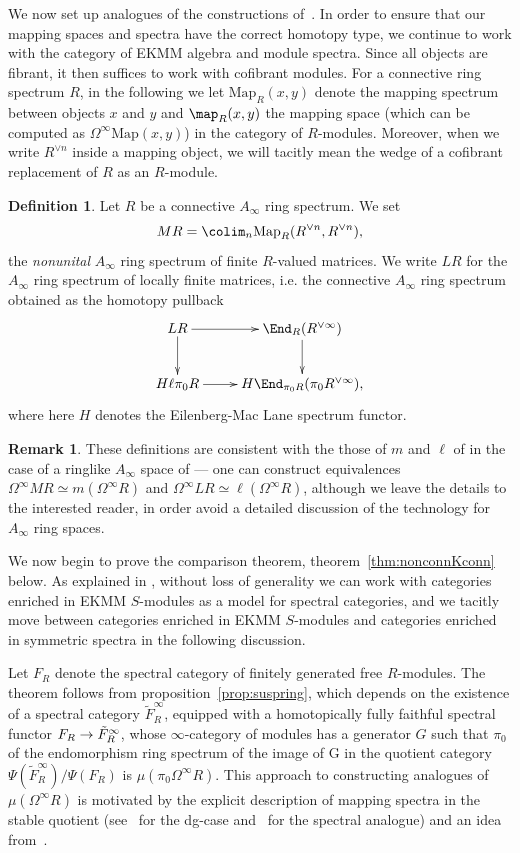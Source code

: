 \documentclass{amsart}
\renewcommand{\to}{\mathchoice{\longrightarrow}{\rightarrow}{\rightarrow}{\rightarrow}}
\newcommand{\Map}{\mathrm{Map}}%
\renewcommand{\i}{\infty}
\numberwithin{equation}{section}
\theoremstyle{definition}
\newtheorem{definition}[equation]{Definition}
\newtheorem{remark}[equation]{Remark}
\begin{document}
We now set up analogues of the constructions of~\cite{noncondeloop}.
In order to ensure that our mapping spaces and spectra have the correct
homotopy type, we continue to work with the category of EKMM algebra
and module spectra.  Since all objects are fibrant, it then suffices
to work with cofibrant modules.  For a connective ring spectrum $R$,
in the following we let $\Map_R(x,y)$ denote the mapping spectrum
between objects $x$ and $y$ and $\map_R(x,y)$ the mapping space (which
can be computed as $\Omega^\infty \Map(x,y)$) in the category of
$R$-modules.  Moreover, when we write $R^{\lor n}$ inside a mapping
object, we will tacitly mean the wedge of a cofibrant replacement of
$R$ as an $R$-module.

\begin{definition}\label{defn:lfmat}
Let $R$ be a connective $A_\i$ ring spectrum.
We set 
\[
MR =\colim_n\Map_R(R^{\lor n},R^{\lor n}),
\]
the {\em nonunital} $A_\i$ ring spectrum of finite $R$-valued matrices.
We write $LR$ for the $A_\i$ ring spectrum of locally finite matrices,
i.e. the connective $A_\i$ ring spectrum obtained as the homotopy
pullback
\[
\xymatrix{
LR\ar[r]\ar[d] & \End_R(R^{\lor\infty})\ar[d]\\
H\ell\pi_0 R\ar[r] & H\End_{\pi_0 R}(\pi_0 R^{\lor\infty}),}
\]
where here $H$ denotes the Eilenberg-Mac Lane spectrum functor.
\end{definition}

\begin{remark}
These definitions are consistent with the those of $m$ and
$\ell$ of \cite{noncondeloop} in the case of a ringlike $A_\infty$
space of \cite{noncondeloop} --- one can construct equivalences
$\Omega^\i MR \simeq m(\Omega^\infty R)$ and $\Omega^\i
LR \simeq\ell(\Omega^\infty R)$, although we leave the details to the
interested reader, in order avoid a detailed discussion of the
technology for $A_\infty$ ring spaces.
\end{remark}

We now begin to prove the comparison theorem,
theorem~\ref{thm:nonconnKconn} below.  As explained in \cite[\S
15]{BM}, without loss of generality we can work with categories
enriched in EKMM $S$-modules as a model for spectral categories, and
we tacitly move between categories enriched in EKMM $S$-modules and
categories enriched in symmetric spectra in the following discussion.

Let $F_R$ denote the spectral category of finitely generated free
$R$-modules.  The theorem follows from
proposition~\ref{prop:suspring}, which depends on the existence of a
spectral category $\tilde{F}^\infty_R$, equipped with a homotopically
fully faithful spectral functor $F_R\to \tilde{F}^\infty_R$, whose
$\i$-category of modules has a generator $G$ such that $\pi_0$ of the
endomorphism ring spectrum of the image of G in the quotient category
$\Psi(\tilde{F}^\infty_R)/ \Psi(F_R)$ is $\mu(\pi_0\Omega^\infty R)$.
This approach to constructing analogues of $\mu (\Omega^\infty R)$ is
motivated by the explicit description of mapping spectra in the stable
quotient (see~\cite[1.3]{Drinfeld} for the dg-case and~\cite[\S 6]{BM}
for the spectral analogue) and an idea
from~\cite[6.1]{PedersenWeibel}.
\end{document}
